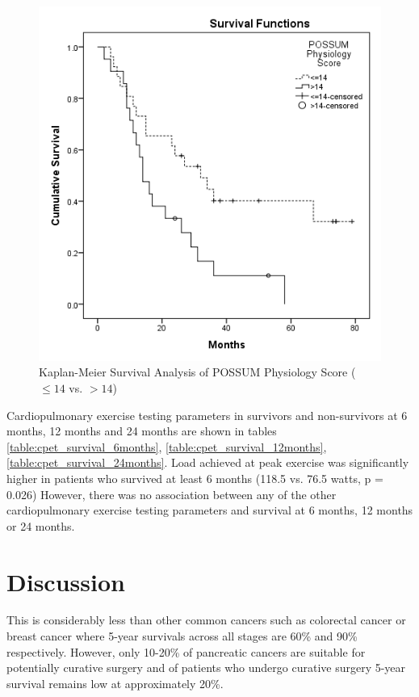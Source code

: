 \begin{figure}[htbp]
	\centering
	\includegraphics[width=0.8\linewidth]{Figures/cpet_survival_km_possum}
	\caption{Kaplan-Meier Survival Analysis of POSSUM Physiology Score ($\leq14$ vs. $>14$)}
	\label{fig:cpet_survival_km_possum}
\end{figure}


Cardiopulmonary exercise testing parameters in survivors and non-survivors at 6 months, 12 months and 24 months are shown in tables \ref{table:cpet_survival_6months}, \ref{table:cpet_survival_12months}, \ref{table:cpet_survival_24months}. Load achieved at peak exercise was significantly higher in patients who survived at least 6 months (118.5 vs. 76.5 watts, p = 0.026) However, there was no association between any of the other cardiopulmonary exercise testing parameters and survival at 6 months, 12 months or 24 months.






\section{Discussion}

 This is considerably less than other common cancers such as colorectal cancer or breast cancer where 5-year survivals across all stages are 60\% and 90\% respectively. However, only 10-20\% of pancreatic cancers are suitable for potentially curative surgery and of patients who undergo curative surgery 5-year survival remains low at approximately 20\%.\parencite{cancerresearchuk_cancer_2014}